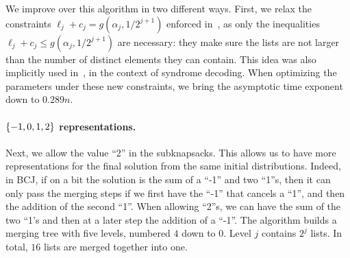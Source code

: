 We improve over this algorithm in two different ways. First, we relax the constraints $\ell_j + c_j = g(\alpha_j, 1/2^{j+1})$ enforced in~\cite{DBLP:conf/eurocrypt/BeckerCJ11}, as only the inequalities $\ell_j + c_j \leqslant g(\alpha_j, 1/2^{j+1})$ are necessary: they make sure the lists are not larger than the number of distinct elements they can contain. This idea was also implicitly used in~\cite{DBLP:conf/sacrypt/BricoutCDL19}, in the context of syndrome decoding. When optimizing the parameters under these new constraints, we bring the asymptotic time exponent down to $0.289n$. 

\paragraph{$\{-1,0,1,2\}$ representations.} Next, we allow the value ``2'' in the subknapsacks. This allows us to have more representations for the final solution from the same initial distributions. Indeed, in BCJ, if on a bit the solution is the sum of a ``-1'' and two ``1''s, then it can only pass the merging steps if we first have the ``-1'' that cancels a ``1'', and then the addition of the second ``1''. When allowing ``2''s, we can have the sum of the two ``1's and then at a later step the addition of a ``-1''. The algorithm builds a merging tree with five levels, numbered $4$ down to $0$. Level $j$ contains $2^j$ lists. In total, $16$ lists are merged together into one.
